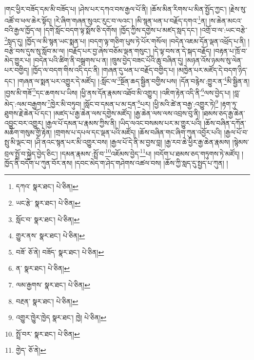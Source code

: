 །གང་ཕྱིར་བཟོད་དམ་མི་བཟོད་པ། །ཤེས་པར་དཀའ་བས་རྒྱལ་པོ་ནི། །ཆོས་མིན་རིགས་པ་མིན་སྤྱོད་ཀྱང་། །རྗེས་སུ་འཚོ་བ་ཕལ་ཆེར་སྟོད། །རེ་ཞིག་གཞན་སུའང་རུང་བ་ལའང་། །མི་སྙན་ཕན་པ་བརྗོད་དགའ་\footnote{དཀའ་  སྣར་ཐང་།  པེ་ཅིན། }ན། །ས་ཆེན་མངའ་བའི་རྒྱལ་ཁྱོད་ལ། །དགེ་སློང་བདག་ལྟ་སྨོས་ཅི་དགོས། །ཁྱོད་ཀྱིས་དགྱེས་པ་མཛད་སླད་དང་། །འགྲོ་བ་ལ་:ཡང་བརྩེ་\footnote{ཡང་རྩེ་  སྣར་ཐང་།  པེ་ཅིན། }སླད་དུ། །ཁྱོད་ལ་མི་སྙན་ཡང་སྨན་པ། །བདག་ལྟ་གཅིག་པུས་ཏེ་པོར་གསོལ། །བདེན་འཇམ་དོན་ལྡན་འཕྲོད་པ་ནི། །བརྩེ་བས་དུས་སུ་སློབ་མ་ལ། །བརྗོད་པར་བྱ་ཞེས་བཅོམ་ལྡན་གསུང་། །དེ་ལྟ་བས་ན་དེ་སྐད་བརྗོད། །བརྟན་པ་ཁྲོ་བ་མེད་གྱུར་པ། །བདེན་པའི་ཚིག་ནི་བསྒྲགས་པ་ན། །ཁྲུས་བྱེད་བཟང་པོའི་ཆུ་བཞིན་དུ། །མཉན་འོས་ཉམས་སུ་ལེན་པར་བགྱིད། །ཁྱོད་ལ་བདག་གིས་འདི་དང་ནི། །གཞན་དུ་ཕན་པ་བརྗོད་བགྱིད་པ། །མཁྱེན་པར་མཛོད་དེ་བདག་ཉིད་དང་། །གཞན་ལ་སྨན་པར་འགྱུར་དེ་མཛོད། །:སློང་ལ་\footnote{སློང་བ་  སྣར་ཐང་།  པེ་ཅིན། }སྔོན་ཆད་སྦྱིན་བགྱིས་པས། །དོན་བརྙེས་:གྱུར་ན་\footnote{གྱུར་ནས་  སྣར་ཐང་།  པེ་ཅིན། }མི་སྦྱིན་ན། །བྱས་མི་གཟོ་\footnote{བཟོ་  ཅོ་ནེ། བཟོད་  སྣར་ཐང་།  པེ་ཅིན། }དང་ཆགས་པ་ཡིས། །ཕྱི་ནས་དོན་རྣམས་འཐོབ་མི་འགྱུར། །འཇིག་རྟེན་འདི་ནི་\footnote{ན་  སྣར་ཐང་།  པེ་ཅིན། }ལས་བྱེད་པ། །བླ་མེད་:ལམ་བརྒྱགས་\footnote{ལམ་རྒྱགས་  སྣར་ཐང་།  པེ་ཅིན། }ཁྱེར་མི་བཏུབ། །སློང་བ་དམན་པ་མ་དྲན་\footnote{བརྔན་  སྣར་ཐང་།  པེ་ཅིན། }པར། །ཕྱི་མའི་ཚེ་ན་བརྒྱ་:འགྱུར་ཏེ།\footnote{འགྱུར་ཁྱེུར་ཁྱེད  སྣར་ཐང་། ཁྱེ།  པེ་ཅིན། } །རྟག་ཏུ་ཐུགས་རྗེ་ཆེན་པོ་དང་། །མཛད་པ་རྒྱ་ཆེན་ལས་དགྱེས་མཛོད། །རྒྱ་ཆེན་ལས་ལས་འབྲས་བུ་ནི། །ཐམས་ཅད་རྒྱ་ཆེན་འབྱུང་བར་འགྱུར། །རྒྱལ་པོ་དམན་པ་རྣམས་ཀྱིས་ནི། །ཡིད་ལའང་བསམས་པར་མ་གྱུར་པའི། །ཆོས་བཞིན་དཀོན་མཆོག་གསུམ་གྱི་རྟེན། །གྲགས་པ་དཔལ་དང་ལྡན་པའི་མཛོད། །ཆོས་བཞིན་གང་ཞིག་ཀུན་འབྱོར་པའི། །རྒྱལ་པོ་བ་སྤུ་མི་ལྡང་བ། །ཤི་ནའང་སྙན་པར་མི་འགྱུར་བས། །རྒྱལ་པོ་དེ་ནི་མ་བྱས་བླ། །རྒྱ་རབ་ཆེ་ཕྱིར་རྒྱ་ཆེན་རྣམས། །སྙེམས་བྲལ་སྤྲོ་བ་སྐྱེད་བྱེད་ཅིང་། །དམན་རྣམས་:སྤྲོ་བ་\footnote{སྤྲོ་བར་  སྣར་ཐང་།  པེ་ཅིན། }འཇོམས་བྱེད་\footnote{གྱེད་  ཅོ་ནེ། }པ། །བདོག་པ་ཐམས་ཅད་གཏུགས་ཏེ་མཛོད། །ཁྱོད་ནི་བདོག་པ་ཀུན་བོར་ནས། །དབང་མེད་ག་ཤེད་གཤེགས་འཚལ་བས། །ཆོས་ཀྱི་སླད་དུ་སྤྱད་པ་ཀུན། །
